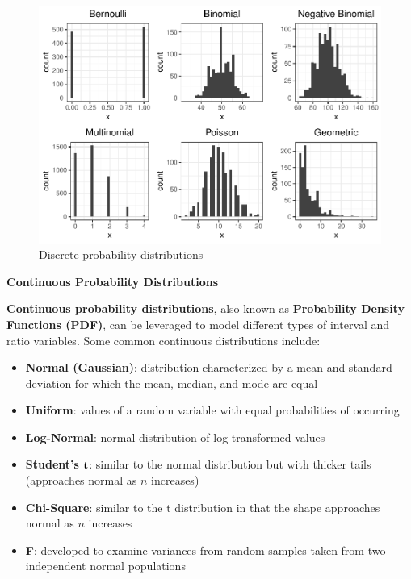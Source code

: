 \documentclass[
]{book}
\providecommand{\tightlist}{%
  \setlength{\itemsep}{0pt}\setlength{\parskip}{0pt}}
\begin{document}
\begin{figure}

{\centering \includegraphics{The_Fundamentals_of_People_Analytics_files/figure-latex/discrete-dist-1} 

}

\caption{Discrete probability distributions}\label{fig:discrete-dist}
\end{figure}

\textbf{Continuous Probability Distributions}

\textbf{Continuous probability distributions}, also known as \textbf{Probability Density Functions (PDF)}, can be leveraged to model different types of interval and ratio variables. Some common continuous distributions include:

\begin{itemize}
\tightlist
\item
  \textbf{Normal (Gaussian)}: distribution characterized by a mean and standard deviation for which the mean, median, and mode are equal
\item
  \textbf{Uniform}: values of a random variable with equal probabilities of occurring
\item
  \textbf{Log-Normal}: normal distribution of log-transformed values
\item
  \textbf{Student's} \(\textbf t\): similar to the normal distribution but with thicker tails (approaches normal as \(n\) increases)
\item
  \textbf{Chi-Square}: similar to the t distribution in that the shape approaches normal as \(n\) increases
\item
  \textbf{F}: developed to examine variances from random samples taken from two independent normal populations
\end{itemize}
\end{document}
